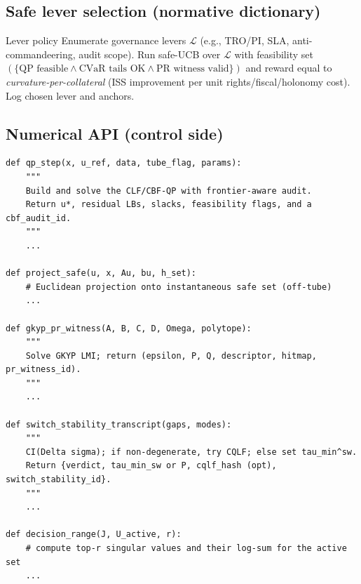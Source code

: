 \subsection{Safe lever selection (normative dictionary)}\label{subsec:levers}
\emph{}

\begin{rulex}{Lever policy}\label{rule:lever-policy}
Enumerate governance levers $\mathcal L$ (e.g., TRO/PI, SLA, anti-commandeering, audit scope). Run safe-UCB over $\mathcal L$ with feasibility set
$(
\{\text{QP feasible} \wedge \text{CVaR tails OK} \wedge \text{PR witness valid}\}
)$
and reward equal to \emph{curvature-per-collateral} (ISS improvement per unit rights/fiscal/holonomy cost). Log chosen lever and anchors.
\end{rulex}

\subsection{Numerical API (control side)}\label{subsec:api-ctrl}
\emph{}
\begin{lstlisting}
def qp_step(x, u_ref, data, tube_flag, params):
    """
    Build and solve the CLF/CBF-QP with frontier-aware audit.
    Return u*, residual LBs, slacks, feasibility flags, and a cbf_audit_id.
    """
    ...

def project_safe(u, x, Au, bu, h_set):
    # Euclidean projection onto instantaneous safe set (off-tube)
    ...

def gkyp_pr_witness(A, B, C, D, Omega, polytope):
    """
    Solve GKYP LMI; return (epsilon, P, Q, descriptor, hitmap, pr_witness_id).
    """
    ...

def switch_stability_transcript(gaps, modes):
    """
    CI(Delta sigma); if non-degenerate, try CQLF; else set tau_min^sw.
    Return {verdict, tau_min_sw or P, cqlf_hash (opt), switch_stability_id}.
    """
    ...

def decision_range(J, U_active, r):
    # compute top-r singular values and their log-sum for the active set
    ...
\end{lstlisting}


